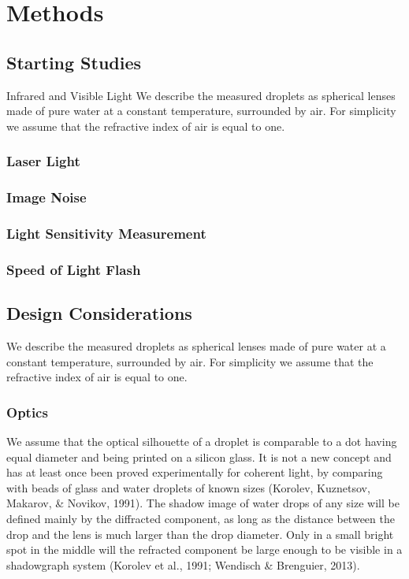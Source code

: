 
\chapter{Methods}
\label{chap:methods}

\section{Starting Studies}
Infrared and Visible Light
We describe the measured droplets as spherical lenses made of pure water at a constant temperature, surrounded by air. For simplicity we assume that the refractive index of air is equal to one.
\subsection{Laser Light}

\subsection{Image Noise}

\subsection{Light Sensitivity Measurement}

\subsection{Speed of Light Flash}

\section{Design Considerations}

We describe the measured droplets as spherical lenses made of pure water at a constant temperature, surrounded by air. For simplicity we assume that the refractive index of air is equal to one.

\subsection{Optics}

We assume that the optical silhouette of a droplet is comparable to a dot having equal diameter and being printed on a silicon glass. It is not a new concept and has at least once been proved experimentally for coherent light, by comparing with beads of glass and water droplets of known sizes (Korolev, Kuznetsov, Makarov, \& Novikov, 1991). The shadow image of water drops of any size will be defined mainly by the diffracted component, as long as the distance between the drop and the lens is much larger than the drop diameter. Only in a small bright spot in the middle will the refracted component be large enough to be visible in a shadowgraph system (Korolev et al., 1991; Wendisch \& Brenguier, 2013).



